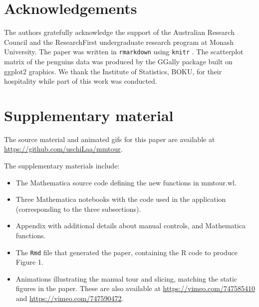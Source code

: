 \documentclass[]{interact}
\theoremstyle{plain}%
\theoremstyle{definition}
\theoremstyle{remark}
\providecommand{\tightlist}{%
  \setlength{\itemsep}{0pt}\setlength{\parskip}{0pt}}
\def\tightlist{}
\begin{document}
\hypertarget{acknowledgements}{%
\section*{Acknowledgements}\label{acknowledgements}}

The authors gratefully acknowledge the support of the Australian
Research Council and the ResearchFirst undergraduate research program at
Monash University. The paper was written in \texttt{rmarkdown}
\citep{rmarkdown} using \texttt{knitr} \citep{knitr}. The scatterplot
matrix of the penguins data was produced by the GGally \citep{GGally}
package built on ggplot2 \citep{ggplot2} graphics. We thank the
Institute of Statistics, BOKU, for their hospitality while part of this
work was conducted.

\hypertarget{supplementary-material}{%
\section*{Supplementary material}\label{supplementary-material}}

The source material and animated gifs for this paper are available at
\url{https://github.com/uschiLaa/mmtour}.

The supplementary materials include:

\begin{itemize}
\tightlist
\item
  The Mathematica source code defining the new functions in mmtour.wl.
\item
  Three Mathematica notebooks with the code used in the application
  (corresponding to the three subsections).
\item
  Appendix with additional details about manual controls, and
  Mathematica functions.
\item
  The \texttt{Rmd} file that generated the paper, containing the R code
  to produce Figure 1.
\item
  Animations illustrating the manual tour and slicing, matching the
  static figures in the paper. These are also available at
  \url{https://vimeo.com/747585410} and
  \url{https://vimeo.com/747590472}.
\end{itemize}



\end{document}
